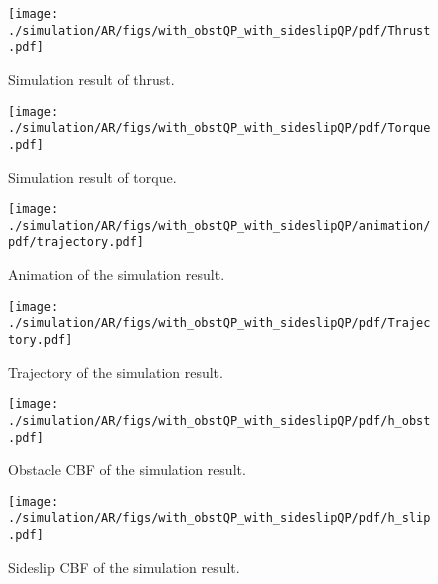 \begin{figure}[t]
\centering
\texttt{[image: ./simulation/AR/figs/with\_obstQP\_with\_sideslipQP/pdf/Thrust.pdf]}
\caption{Simulation result of thrust.}
\label{figs:simulation_result_of_thrust}
\end{figure}

\begin{figure}[t]
\centering
\texttt{[image: ./simulation/AR/figs/with\_obstQP\_with\_sideslipQP/pdf/Torque.pdf]}
\caption{Simulation result of torque.}
\label{figs:simulation_result_of_torque}
\end{figure}


\begin{figure}[t]
  \centering
  \texttt{[image: ./simulation/AR/figs/with\_obstQP\_with\_sideslipQP/animation/pdf/trajectory.pdf]}
  \caption{Animation of the simulation result.}
  \label{figs:animation_of_the_simulation_result}
\end{figure}

\begin{figure}[t]
  \centering
  \texttt{[image: ./simulation/AR/figs/with\_obstQP\_with\_sideslipQP/pdf/Trajectory.pdf]}
  \caption{Trajectory of the simulation result.}
  \label{figs:trajectory_of_the_simulation_result}
\end{figure}

\begin{figure}[t]
\centering
\texttt{[image: ./simulation/AR/figs/with\_obstQP\_with\_sideslipQP/pdf/h\_obst.pdf]}
\caption{Obstacle CBF of the simulation result.}
\label{figs:obstacle_CBF_of_the_simulation_result}
\end{figure}

\begin{figure}[t]
\centering
\texttt{[image: ./simulation/AR/figs/with\_obstQP\_with\_sideslipQP/pdf/h\_slip.pdf]}
\caption{Sideslip CBF of the simulation result.}
\label{figs:sideslip_CBF_of_the_simulation_result}
\end{figure}

